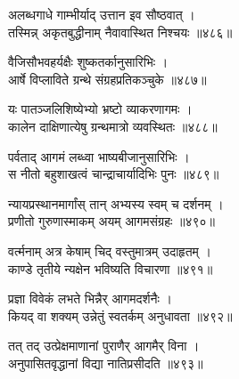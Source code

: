 अलब्धगाधे गाम्भीर्याद् उत्तान इव सौष्ठवात् ।\\तस्मिन्न् अकृतबुद्धीनाम् नैवावास्थित निश्चयः ॥४८६॥

वैजिसौभवहर्यक्षैः शुष्कतर्कानुसारिभिः ।\\आर्षे विप्लाविते ग्रन्थे संग्रहप्रतिकञ्चुके ॥४८७॥

यः पातञ्जलिशिष्येभ्यो भ्रष्टो व्याकरणागमः ।\\कालेन दाक्षिणात्येषु ग्रन्थमात्रो व्यवस्थितः ॥४८८॥

पर्वताद् आगमं लब्ध्वा भाष्यबीजानुसारिभिः ।\\स नीतो बहुशाखत्वं चान्द्राचार्यादिभिः पुनः ॥४८९॥

न्यायप्रस्थानमार्गांस् तान् अभ्यस्य स्वम् च दर्शनम् ।\\प्रणीतो गुरुणास्माकम् अयम् आगमसंग्रहः ॥४९०॥

वर्त्मनाम् अत्र केषाम् चिद् वस्तुमात्रम् उदाहृतम् ।\\काण्डे तृतीये न्यक्षेन भविष्यति विचारणा ॥४९१॥

प्रज्ञा विवेकं लभते भिन्नैर् आगमदर्शनैः ।\\कियद् वा शक्यम् उन्नेतुं स्वतर्कम् अनुधावता ॥४९२॥

तत् तद् उत्प्रेक्षमाणानां पुराणैर् आगमैर् विना ।\\अनुपासितवृद्धानां विद्या नातिप्रसीदति ॥४९३॥
